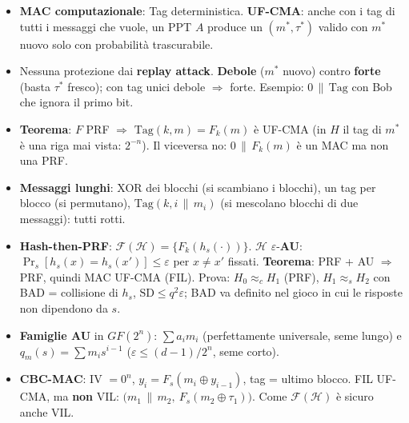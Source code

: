 \begin{itemize}
  \item \textbf{MAC computazionale}: Tag deterministica. \textbf{UF-CMA}: anche con i tag di tutti i messaggi che vuole, un PPT \(A\) produce un \((m^*, \tau^*)\) valido con \(m^*\) nuovo solo con probabilità trascurabile.
  \item Nessuna protezione dai \textbf{replay attack}. \textbf{Debole} (\(m^*\) nuovo) contro \textbf{forte} (basta \(\tau^*\) fresco); con tag unici debole \(\Rightarrow\) forte. Esempio: \(0 \,\|\, \text{Tag}\) con Bob che ignora il primo bit.
  \item \textbf{Teorema}: \(F\) PRF \(\Rightarrow\) \(\text{Tag}(k, m) = F_k(m)\) è UF-CMA (in \(H\) il tag di \(m^*\) è una riga mai vista: \(2^{-n}\)). Il viceversa no: \(0 \,\|\, F_k(m)\) è un MAC ma non una PRF.
  \item \textbf{Messaggi lunghi}: XOR dei blocchi (si scambiano i blocchi), un tag per blocco (si permutano), \(\text{Tag}(k, i \,\|\, m_i)\) (si mescolano blocchi di due messaggi): tutti rotti.
  \item \textbf{Hash-then-PRF}: \(\mathcal{F}(\mathcal{H}) = \{F_k(h_s(\cdot))\}\). \(\mathcal{H}\) \(\varepsilon\)-\textbf{AU}: \(\Pr_s[h_s(x) = h_s(x')] \le \varepsilon\) per \(x \ne x'\) fissati. \textbf{Teorema}: PRF + AU \(\Rightarrow\) PRF, quindi MAC UF-CMA (FIL). Prova: \(H_0 \approx_c H_1\) (PRF), \(H_1 \approx_s H_2\) con BAD = collisione di \(h_s\), \(\text{SD} \le q^2 \varepsilon\); BAD va definito nel gioco in cui le risposte non dipendono da \(s\).
  \item \textbf{Famiglie AU} in \(GF(2^n)\): \(\sum a_i m_i\) (perfettamente universale, seme lungo) e \(q_m(s) = \sum m_i s^{i-1}\) (\(\varepsilon \le (d-1)/2^n\), seme corto).
  \item \textbf{CBC-MAC}: IV \(= 0^n\), \(y_i = F_s(m_i \oplus y_{i-1})\), tag = ultimo blocco. FIL UF-CMA, ma \textbf{non} VIL: \(\big(m_1 \,\|\, m_2,\ F_s(m_2 \oplus \tau_1)\big)\). Come \(\mathcal{F}(\mathcal{H})\) è sicuro anche VIL.
\end{itemize}
